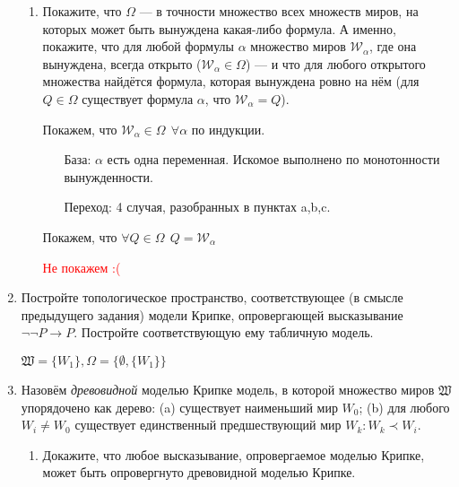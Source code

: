 \begin{enumerate}[wide, labelwidth=!, labelindent=0pt]
\begin{enumerate}
                  \item Покажите, что $\Omega$ --- в точности множество всех множеств миров, на которых может быть вынуждена какая-либо формула.
                        А именно, покажите, что для любой формулы $\alpha$ множество миров $\mathcal{W}_\alpha$, где она вынуждена, всегда открыто
                        ($\mathcal{W}_\alpha \in \Omega$) --- и что для любого открытого множества найдётся формула, которая вынуждена ровно на нём
                        (для $Q \in \Omega$ существует формула $\alpha$, что $\mathcal{W}_\alpha = Q$).

                        Покажем, что \(\mathcal{W}_\alpha \in \Omega \ \ \forall \alpha\) по индукции.

                        \begin{itemize}
                              \item [База:] \(\alpha\) есть одна переменная. Искомое выполнено по монотонности вынужденности.
                              \item [Переход:] 4 случая, разобранных в пунктах a,b,c.
                        \end{itemize}

                        Покажем, что \(\forall Q\in \Omega \ \ Q = \mathcal{W}_\alpha\)

                        \textcolor{red}{Не покажем :(}
            \end{enumerate}

      \item Постройте топологическое пространство, соответствующее (в смысле предыдущего задания) модели Крипке, опровергающей
            высказывание $\neg\neg P\rightarrow P$.
            Постройте соответствующую ему табличную модель.

            \(\mathfrak{W} = \{W_1\}, \Omega = \{\emptyset, \{W_1\}\} \)

      \item Назовём \emph{древовидной} моделью Крипке модель, в которой множество
            миров $\mathfrak{W}$ упорядочено как дерево: (a) существует наименьший мир
            $W_0$; (b) для любого $W_i \ne W_0$ существует единственный предшествующий мир
            $W_k: W_k \prec W_i$.
            \begin{enumerate}
                  \item Докажите, что любое высказывание, опровергаемое моделью Крипке, может
                        быть опровергнуто древовидной моделью Крипке.


\end{enumerate}
\end{enumerate}
